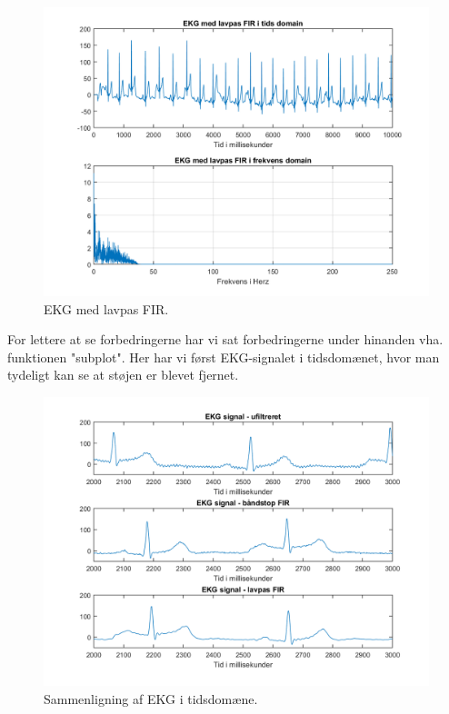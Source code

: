 \documentclass[12pt, letterpaper]{article}
\begin{document}
\begin{figure}[H]
           \includegraphics[width=\linewidth]{billeder/EKGlavpasFIR}	   							\caption{EKG med lavpas FIR.}
\end{figure}

For lettere at se forbedringerne har vi sat forbedringerne under hinanden vha. funktionen "subplot". Her har vi først EKG-signalet i tidsdomænet, hvor man tydeligt kan se at støjen er blevet fjernet. 

\begin{figure}[H]
           \includegraphics[width=\linewidth]{billeder/EKGtidsdomain}	   							\caption{Sammenligning af EKG i tidsdomæne.}
\end{figure}
\end{document}
